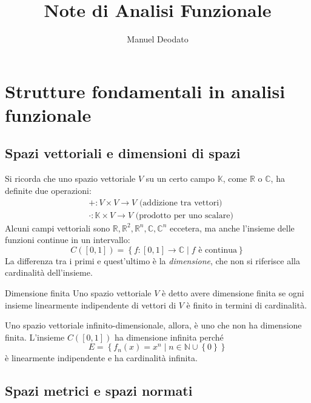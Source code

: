 \documentclass[11pt, a4paper]{scrartcl}
\title{Note di Analisi Funzionale}
\author{Manuel Deodato}
\date{}
\theoremstyle{definition}
\numberwithin{esempio}{section}
\theoremstyle{definition}
\numberwithin{obs}{section}
\numberwithin{nota}{section}
\renewcommand{\maketitle}{
\begin{center}
{\sffamily
{\fontsize{20}{20}\selectfont\MakeUppercase\thetitle}}

\vspace{0.2in}

{\large\scshape\sffamily\theauthor}
\end{center}
}
\numberwithin{equation}{subsection}
\begin{document}
\maketitle
\newpage
\tableofcontents 
\newpage
\section{Strutture fondamentali in analisi funzionale}

\subsection{Spazi vettoriali e dimensioni di spazi}

Si ricorda che uno spazio vettoriale $V$ su un certo campo $\mathbb{K}$, come $\mathbb{R}$ o $\mathbb{C}$, ha definite due operazioni:
\[
	\begin{split}
		&+ : V \times V \to V \text{ (addizione tra vettori)}\\
		&\cdot  : \mathbb{K} \times V \to V \text{ (prodotto per uno scalare)}
	\end{split}
\] 
Alcuni campi vettoriali sono $\mathbb{R}, \mathbb{R}^2, \mathbb{R}^n,\mathbb{C}, \mathbb{C}^n$ eccetera, ma anche l'insieme delle funzioni continue in un intervallo:
\begin{equation}
	C\left(\left[ 0,1 \right]\right) = \left\{ f : \left[ 0,1 \right] \to \mathbb{C}  \mid  f \text{ \`e continua} \right\} 
\end{equation}
La differenza tra i primi e quest'ultimo \`e la \textit{dimensione}, che non si riferisce alla cardinalit\`a dell'insieme.
\begin{definizione}
	{Dimensione finita}{}
	Uno spazio vettoriale $V$ \`e detto avere dimensione finita se ogni insieme linearmente indipendente di vettori di $V$ \`e finito in termini di cardinalit\`a.
\end{definizione}
\noindent Uno spazio vettoriale infinito-dimensionale, allora, \`e uno che non ha dimensione finita.
L'insieme $C\left(\left[ 0,1 \right] \right) $ ha dimensione infinita perch\'e 
\begin{equation}
	E= \left\{ f_n(x) = x^n  \mid n \in \mathbb{N}\cup \left\{ 0 \right\} \right\} 
\end{equation}
\`e linearmente indipendente e ha cardinalit\`a infinita.
\subsection{Spazi metrici e spazi normati}
\end{document}
